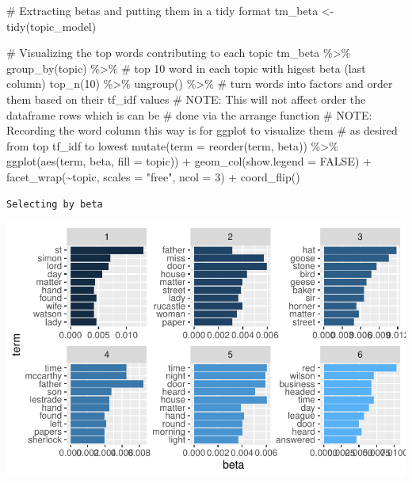 \documentclass[
  letterpaper,
  DIV=11,
  numbers=noendperiod]{scrreprt}
\newenvironment{Shaded}{\begin{snugshade}}{\end{snugshade}}
\newcommand{\AlertTok}[1]{\textcolor[rgb]{0.68,0.00,0.00}{#1}}
\newcommand{\AttributeTok}[1]{\textcolor[rgb]{0.40,0.45,0.13}{#1}}
\newcommand{\CommentTok}[1]{\textcolor[rgb]{0.37,0.37,0.37}{#1}}
\newcommand{\ConstantTok}[1]{\textcolor[rgb]{0.56,0.35,0.01}{#1}}
\newcommand{\DecValTok}[1]{\textcolor[rgb]{0.68,0.00,0.00}{#1}}
\newcommand{\FunctionTok}[1]{\textcolor[rgb]{0.28,0.35,0.67}{#1}}
\newcommand{\NormalTok}[1]{\textcolor[rgb]{0.00,0.23,0.31}{#1}}
\newcommand{\OtherTok}[1]{\textcolor[rgb]{0.00,0.23,0.31}{#1}}
\newcommand{\SpecialCharTok}[1]{\textcolor[rgb]{0.37,0.37,0.37}{#1}}
\newcommand{\StringTok}[1]{\textcolor[rgb]{0.13,0.47,0.30}{#1}}
\begin{document}
\begin{Shaded}
\begin{Highlighting}[]
\CommentTok{\# Extracting betas and putting them in a tidy format}
\NormalTok{tm\_beta }\OtherTok{\textless{}{-}} \FunctionTok{tidy}\NormalTok{(topic\_model)}

\CommentTok{\# Visualizing the top words contributing to each topic}
\NormalTok{tm\_beta }\SpecialCharTok{\%\textgreater{}\%} 
  \FunctionTok{group\_by}\NormalTok{(topic) }\SpecialCharTok{\%\textgreater{}\%} 
  \CommentTok{\# top 10 word in each topic with higest beta (last column)}
  \FunctionTok{top\_n}\NormalTok{(}\DecValTok{10}\NormalTok{) }\SpecialCharTok{\%\textgreater{}\%} 
  \FunctionTok{ungroup}\NormalTok{() }\SpecialCharTok{\%\textgreater{}\%} 
  \CommentTok{\# turn words into factors and order them based on their tf\_idf values}
  \CommentTok{\# }\AlertTok{NOTE}\CommentTok{: This will not affect order the dataframe rows which is can be}
  \CommentTok{\#   done via the arrange function}
  \CommentTok{\# }\AlertTok{NOTE}\CommentTok{: Recording the word column this way is for ggplot to visualize them}
  \CommentTok{\#   as desired from top tf\_idf to lowest}
  \FunctionTok{mutate}\NormalTok{(}\AttributeTok{term =} \FunctionTok{reorder}\NormalTok{(term, beta)) }\SpecialCharTok{\%\textgreater{}\%} 
  \FunctionTok{ggplot}\NormalTok{(}\FunctionTok{aes}\NormalTok{(term, beta, }\AttributeTok{fill =}\NormalTok{ topic)) }\SpecialCharTok{+}
  \FunctionTok{geom\_col}\NormalTok{(}\AttributeTok{show.legend =} \ConstantTok{FALSE}\NormalTok{) }\SpecialCharTok{+}
  \FunctionTok{facet\_wrap}\NormalTok{(}\SpecialCharTok{\textasciitilde{}}\NormalTok{topic, }\AttributeTok{scales =} \StringTok{"free"}\NormalTok{, }\AttributeTok{ncol =} \DecValTok{3}\NormalTok{) }\SpecialCharTok{+}
  \FunctionTok{coord\_flip}\NormalTok{()}
\end{Highlighting}
\end{Shaded}

\begin{verbatim}
Selecting by beta
\end{verbatim}

\includegraphics{src/practice/topic-modeling-r_files/figure-pdf/unnamed-chunk-9-1.pdf}
\end{document}
